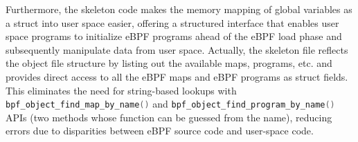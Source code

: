 Furthermore, the skeleton code makes the memory mapping of global variables as a struct into user space easier, offering a structured interface that enables user space programs to initialize eBPF programs ahead of the eBPF load phase and subsequently manipulate data from user space.
Actually, the skeleton file reflects the object file structure by listing out the available maps, programs, etc. and provides direct access to all the eBPF maps and eBPF programs as struct fields. 
This eliminates the need for string-based lookups with \colorbox{backcolour}{\lstinline[style=cstyle, language=C]|bpf_object_find_map_by_name()|} and \colorbox{backcolour}{\lstinline[style=cstyle, language=C]|bpf_object_find_program_by_name()|} APIs (two methods whose function can be guessed from the name), reducing errors due to disparities between eBPF source code and user-space code.